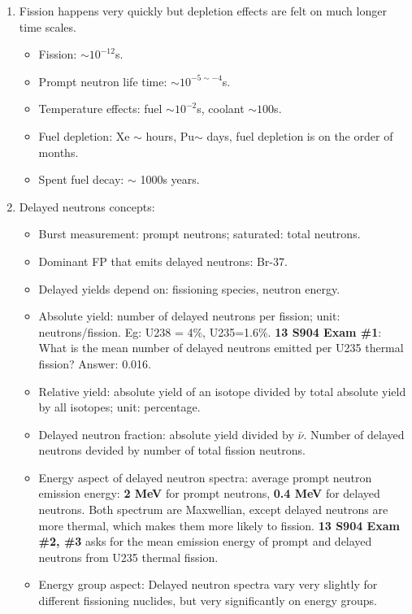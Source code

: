 \documentclass{school-22.211-notes}
\date{May 22, 2012}
\begin{document}
\maketitle


\begin{enumerate}
\item Fission happens very quickly but depletion effects are felt on much longer time scales. 
  \begin{itemize}
    \item Fission: $\sim 10^{-12}$s. 
    \item Prompt neutron life time: $\sim 10^{-5 \sim -4}$s. 
    \item Temperature effects: fuel $\sim 10^{-2}$s, coolant $\sim 100$s. 
    \item Fuel depletion: Xe $\sim$ hours, Pu$\sim$ days, fuel depletion is on the order of months.
    \item Spent fuel decay: $\sim$ 1000s years. 
  \end{itemize}

\item Delayed neutrons concepts: 
  \begin{itemize}
  \item Burst measurement: prompt neutrons; saturated: total neutrons. 
  \item Dominant FP that emits delayed neutrons: Br-37. 
  \item Delayed yields depend on: fissioning species, neutron energy.  
  \item Absolute yield: number of delayed neutrons per fission; unit: neutrons/fission. Eg: U238 = 4\%, U235=1.6\%. \textbf{13 S904 Exam \#1}: What is the mean number of delayed neutrons emitted per U235 thermal fission? Answer: 0.016. 
  \item Relative yield: absolute yield of an isotope divided by total absolute yield by all isotopes; unit: percentage. 
  \item Delayed neutron fraction: absolute yield divided by $\bar{\nu}$. Number of delayed neutrons devided by number of total fission neutrons. 
  \item Energy aspect of delayed neutron spectra: average prompt neutron emission energy: \textbf{2 MeV} for prompt neutrons, \textbf{0.4 MeV} for delayed neutrons. Both spectrum are Maxwellian, except delayed neutrons are more thermal, which makes them more likely to fission. \textbf{13 S904 Exam \#2, \#3} asks for the mean emission energy of prompt and delayed neutrons from U235 thermal fission. 
  \item Energy group aspect: Delayed neutron spectra vary very slightly for different fissioning nuclides, but very significantly on energy groups. 
  \end{itemize}
\end{enumerate}
\end{document}
